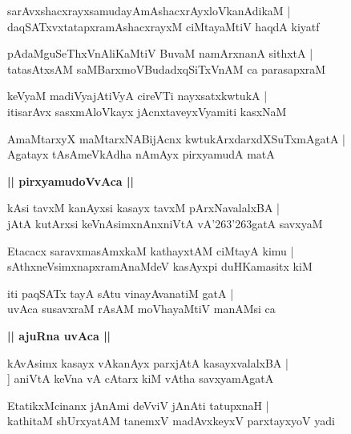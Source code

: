 \documentclass[twoside,12pt,openright]{book}
\def\S{\char'263}
\newcounter{shloka}[chapter]
\def\uvaca#1{\centerline{{\large\textbf{#1}}}}
\begin{document}
\begin{shloka}%
sarAvxshacxrayxsamudayAmAshacxrAyxloVkanAdikaM |\\
daqSATxvxtatapxramAshacxrayxM ciMtayaMtiV haqdA kiyatf 
\end{shloka}

\begin{shloka}%
pAdaMguSeThxVnAliKaMtiV BuvaM namArxnanA sithxtA |\\
tatasAtxsAM saMBarxmoVBudadxqSiTxVnAM ca parasapxraM 
\end{shloka}

\begin{shloka}%
keVyaM madiVyajAtiVyA cireVTi nayxsatxkwtukA |\\
itisarAvx sasxmAloVkayx jAcnxtaveyxVyamiti kasxNaM 
\end{shloka}

\begin{shloka}%
AmaMtarxyX maMtarxNABijAcnx kwtukArxdarxdXSuTxmAgatA |\\
Agatayx tAsAmeVkAdha nAmAyx pirxyamudA matA 
\end{shloka}

\uvaca{|| pirxyamudoVvAca ||}

\begin{shloka}%
kAsi tavxM kanAyxsi kasayx tavxM pArxNavalalxBA |\\
jAtA kutArxsi keVnAsimxnAnxniVtA vA\S\S gatA savxyaM 
\end{shloka}

\begin{shloka}%
Etacacx saravxmasAmxkaM kathayxtAM ciMtayA kimu |\\
sAthxneVsimxnapxramAnaMdeV kasAyxpi duHKamasitx kiM 
\end{shloka}

\begin{shloka}%
iti paqSATx tayA sAtu vinayAvanatiM gatA |\\
uvAca susavxraM rAsAM moVhayaMtiV manAMsi ca
\end{shloka}

\uvaca{|| ajuRna uvAca ||}

\begin{shloka}%
kAvAsimx kasayx vAkanAyx parxjAtA kasayxvalalxBA |\\]
aniVtA keVna vA cAtarx kiM vAtha savxyamAgatA 
\end{shloka}

\begin{shloka}%
EtatikxMcinanx jAnAmi deVviV jAnAti tatupxnaH |\\
kathitaM shUrxyatAM tanemxV madAvxkeyxV parxtayxyoV yadi
\end{shloka}
\end{document}
